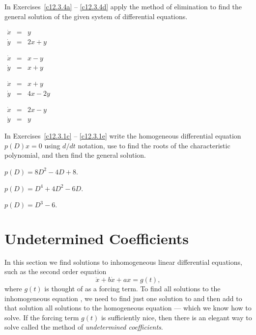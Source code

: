\noindent In Exercises~\ref{c12.3.4a} -- \ref{c12.3.4d} apply the
method of elimination to find the general solution of the given
system of differential equations.
\begin{exercise} \label{c12.3.4a}
$\begin{array}{rcl}
\dot{x} & = & y\\
\dot{y} & = & 2x+y
\end{array}$
\end{exercise}
\begin{exercise} \label{c12.3.4b}
$\begin{array}{rcl}
\dot{x} & = & x-y\\
\dot{y} & = & x+y
\end{array}$
\end{exercise}
\begin{exercise} \label{c12.3.4c}
$\begin{array}{rcl}
\dot{x} & = & x+y\\
\dot{y} & = & 4x-2y
\end{array}$
\end{exercise}
\begin{exercise} \label{c12.3.4d}
$\begin{array}{rcl}
\dot{x} & = & 2x-y\\
\dot{y} & = & y
\end{array}$
\end{exercise}

\CEXER

\noindent In Exercises~\ref{c12.3.1c} -- \ref{c12.3.1e} write the 
homogeneous differential equation $p(D)x=0$ using $d/dt$ notation,
use \Matlab to find the roots of the characteristic polynomial, and 
then find the general solution.
\begin{exercise}  \label{c12.3.1c}
$p(D) = 8D^2 - 4D +8$.
\end{exercise}
\begin{exercise}  \label{c12.3.1d}
$p(D) = D^4 + 4D^2 - 6D$.
\end{exercise}
\begin{exercise}  \label{c12.3.1e}
$p(D) = D^3 -6$.
\end{exercise}

\section{Undetermined Coefficients}
\label{sec:2norderinhom}

In this section we find solutions to inhomogeneous linear differential 
equations, such as the second order equation
\begin{equation}  \label{e:inhom1}
\ddot{x} + b\dot{x} + ax = g(t),
\end{equation}
where $g(t)$ is thought of as a forcing term.   
To find all solutions to 
the inhomogeneous 
equation , we need to find just one solution
to  and then add to that solution all solutions to the 
homogeneous equation --- which we know how to solve.  If the forcing term 
$g(t)$ is sufficiently nice, then there is an elegant way to solve 
 called the method of 
{\em undetermined coefficients}.


